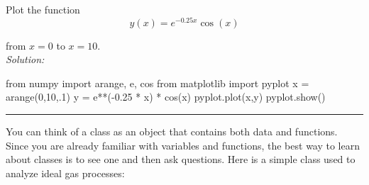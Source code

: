 \begin{enumerate}
    \probtwo Plot the function 
    \[
        y(x) = e^{-0.25 x} \cos(x)
    \]

from $ x = 0$ to $x = 10$.\\
\ifsolutions
\textit{Solution:}\\
\begin{codeexample}
\begin{VerbatimOut}{\listingFile}
from numpy import arange, e, cos
from matplotlib import pyplot
x = arange(0,10,.1)
y = e**(-0.25 * x) * cos(x)
pyplot.plot(x,y)
pyplot.show()
\end{VerbatimOut}
\end{codeexample}
\else
\noindent\rule{5 in}{0.01 in}
\fi
\end{enumerate}
 You can think of a class as an object that
contains both data and functions.  Since you are already familiar with
variables and functions, the best way to learn about classes is to see
one and then ask questions. Here is a simple class used to
analyze ideal gas processes:
